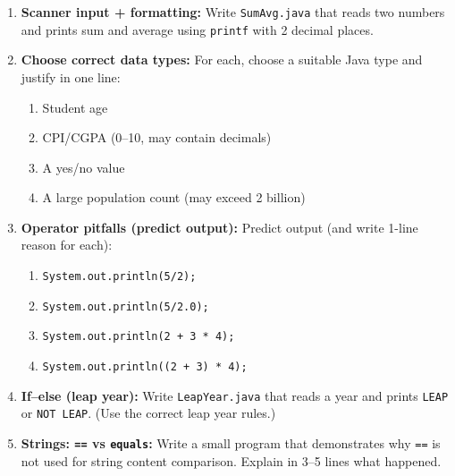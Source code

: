 \documentclass[11pt,a4paper]{article}
\begin{document}
\begin{enumerate}[label=E\arabic*., leftmargin=*]
  \item \textbf{Scanner input + formatting:} Write \texttt{SumAvg.java} that reads two numbers and prints sum and average using
    \texttt{printf} with 2 decimal places.

  \item \textbf{Choose correct data types:} For each, choose a suitable Java type and justify in one line:
    \begin{enumerate}[label=(\alph*), leftmargin=*]
      \item Student age
      \item CPI/CGPA (0--10, may contain decimals)
      \item A yes/no value
      \item A large population count (may exceed 2 billion)
    \end{enumerate}

  \item \textbf{Operator pitfalls (predict output):} Predict output (and write 1-line reason for each):
    \begin{enumerate}[label=(\alph*), leftmargin=*]
      \item \texttt{System.out.println(5/2);}
      \item \texttt{System.out.println(5/2.0);}
      \item \texttt{System.out.println(2 + 3 * 4);}
      \item \texttt{System.out.println((2 + 3) * 4);}
    \end{enumerate}

  \item \textbf{If--else (leap year):} Write \texttt{LeapYear.java} that reads a year and prints \texttt{LEAP} or \texttt{NOT LEAP}.
    (Use the correct leap year rules.)

  \item \textbf{Strings: \texttt{==} vs \texttt{equals}:} Write a small program that demonstrates why
    \texttt{==} is not used for string content comparison. Explain in 3--5 lines what happened.
\end{enumerate}
\end{document}
